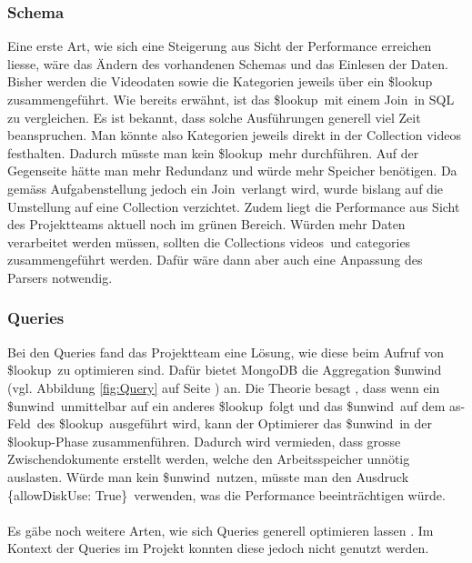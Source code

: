 \documentclass[12pt,titlepage]{article}
\begin{document}
\subsubsection{Schema}
Eine erste Art, wie sich eine Steigerung aus Sicht der Performance erreichen liesse, wäre das Ändern des vorhandenen Schemas und das Einlesen der Daten. Bisher werden die Videodaten sowie die Kategorien jeweils über ein \glqq \$lookup\grqq\, zusammengeführt. Wie bereits erwähnt, ist das \glqq \$lookup\grqq\, mit einem \glqq Join\grqq\, in SQL zu vergleichen. Es ist bekannt, dass solche Ausführungen generell viel Zeit beanspruchen. Man könnte also Kategorien jeweils direkt in der Collection \glqq videos\grqq\, festhalten. Dadurch müsste man kein \glqq \$lookup\grqq\, mehr durchführen. Auf der Gegenseite hätte man mehr Redundanz und würde mehr Speicher benötigen. Da gemäss Aufgabenstellung jedoch ein \glqq Join\grqq\, verlangt wird, wurde bislang auf die Umstellung auf eine Collection verzichtet. Zudem liegt die Performance aus Sicht des Projektteams aktuell noch im grünen Bereich. Würden mehr Daten verarbeitet werden müssen, sollten die Collections \glqq videos\grqq\, und \glqq categories\grqq\, zusammengeführt werden. Dafür wäre dann aber auch eine Anpassung des Parsers notwendig. 

\subsubsection{Queries}\label{unwind}
Bei den Queries fand das Projektteam eine Lösung, wie diese beim Aufruf von \glqq \$lookup\grqq\, zu optimieren sind. Dafür bietet MongoDB die Aggregation \glqq \$unwind\grqq\, (vgl. Abbildung \ref{fig:Query} auf Seite \pageref{fig:Query}) an. Die Theorie besagt , dass wenn ein \glqq \$unwind\grqq\, unmittelbar auf ein anderes \glqq \$lookup\grqq\, folgt und das \glqq \$unwind\grqq\, auf dem \glqq as-Feld\grqq\, des \glqq \$lookup\grqq\, ausgeführt wird, kann der Optimierer das \glqq \$unwind\grqq\, in der \glqq \$lookup\grqq-Phase zusammenführen. Dadurch wird vermieden, dass grosse Zwischendokumente erstellt werden, welche den Arbeitsspeicher unnötig auslasten. Würde man kein \glqq \$unwind\grqq\, nutzen, müsste man den Ausdruck \glqq \{allowDiskUse: True\}\grqq\, verwenden, was die Performance beeinträchtigen würde. \\
\\
Es gäbe noch weitere Arten, wie sich Queries generell optimieren lassen . Im Kontext der Queries im Projekt konnten diese jedoch nicht genutzt werden. 
\end{document}
